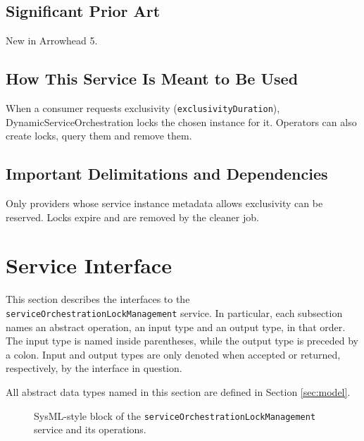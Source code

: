 \documentclass[a4paper]{arrowhead}
\begin{document}
\subsection{Significant Prior Art}

New in Arrowhead 5.

\subsection{How This Service Is Meant to Be Used}

When a consumer requests exclusivity (\texttt{exclusivity\allowbreak{}Duration}), Dynamic\allowbreak{}Service\allowbreak{}Orchestration locks the chosen instance for it. Operators can also create locks, query them and remove them.

\subsection{Important Delimitations and Dependencies}
\label{sec:delimitations}

Only providers whose service instance metadata allows exclusivity can be reserved. Locks expire and are removed by the cleaner job.

\newpage

\section{Service Interface}
\label{sec:operations}

This section describes the interfaces to the \texttt{service\allowbreak{}Orchestration\allowbreak{}Lock\allowbreak{}Management} service.
In particular, each subsection names an abstract operation, an input type and an output type, in that order.
The input type is named inside parentheses, while the output type is preceded by a colon.
Input and output types are only denoted when accepted or returned, respectively, by the interface in question.

All abstract data types named in this section are defined in Section \ref{sec:model}.

\begin{figure}[ht!]
  \centering
  \caption{SysML-style block of the \texttt{service\allowbreak{}Orchestration\allowbreak{}Lock\allowbreak{}Management} service and its operations.}
  \label{fig:SD}
\end{figure}
\end{document}
